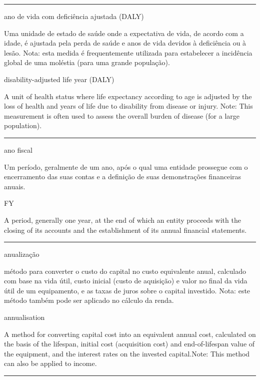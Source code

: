 \documentclass[
  openany]{book}
\begin{document}
\begin{center}\rule{0.5\linewidth}{0.5pt}\end{center}

ano de vida com deficiência ajustada (DALY)

Uma unidade de estado de saúde onde a expectativa de vida, de acordo com a idade, é ajustada pela perda de saúde e anos de vida devidos à deficiência ou à lesão. Nota: esta medida é frequentemente utilizada para estabelecer a incidência global de uma moléstia (para uma grande população).

disability-adjusted life year (DALY)

A unit of health status where life expectancy according to age is adjusted by the loss of health and years of life due to disability from disease or injury. Note: This measurement is often used to assess the overall burden of disease (for a large population).

\begin{center}\rule{0.5\linewidth}{0.5pt}\end{center}

ano fiscal

Um período, geralmente de um ano, após o qual uma entidade prossegue com o encerramento das suas contas e a definição de suas demonstrações financeiras anuais.

FY

A period, generally one year, at the end of which an entity proceeds with the closing of its accounts and the establishment of its annual financial statements.

\begin{center}\rule{0.5\linewidth}{0.5pt}\end{center}

anualização

método para converter o custo do capital no custo equivalente anual, calculado com base na vida útil, custo inicial (custo de aquisição) e valor no final da vida útil de um equipamento, e as taxas de juros sobre o capital investido. Nota: este método também pode ser aplicado no cálculo da renda.

annualisation

A method for converting capital cost into an equivalent annual cost, calculated on the basis of the lifespan, initial cost (acquisition cost) and end-of-lifespan value of the equipment, and the interest rates on the invested capital.Note: This method can also be applied to income.

\begin{center}\rule{0.5\linewidth}{0.5pt}\end{center}
\end{document}
